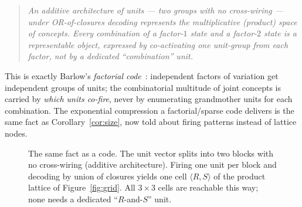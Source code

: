 \documentclass[11pt]{article}
\theoremstyle{definition}
\theoremstyle{plain}
\theoremstyle{remark}
\newcommand{\Dcode}{\mathsf{D}}            %
\begin{document}
\begin{quote}
\emph{An additive architecture of units --- two groups with no cross-wiring ---
under OR-of-closures decoding represents the multiplicative (product) space of
concepts. Every combination of a factor-$1$ state and a factor-$2$ state is a
representable object, expressed by co-activating one unit-group from each factor,
\emph{not} by a dedicated ``combination'' unit.}
\end{quote}

This is exactly Barlow's \emph{factorial code}~\cite{barlow1989,barlow1972,
foldiak1990,foldiak1995,olshausen1996}: independent factors of variation get
independent groups of units; the combinatorial multitude of joint concepts is
carried by \emph{which units co-fire}, never by enumerating grandmother units for
each combination. The exponential compression a factorial/sparse code delivers is
the same fact as Corollary~\ref{cor:size}, now told about firing patterns instead
of lattice nodes.

\begin{figure}[h]
\centering
{}
\caption{The same fact as a code. The unit vector splits into two blocks with no
cross-wiring (additive architecture). Firing one unit per block and decoding by
union of closures yields one cell $\langle R,S\rangle$ of the product lattice of
Figure~\ref{fig:grid}. All $3\times 3$ cells are reachable this way; none needs a
dedicated ``$R$-and-$S$'' unit.}
\label{fig:code}
\end{figure}
\end{document}
